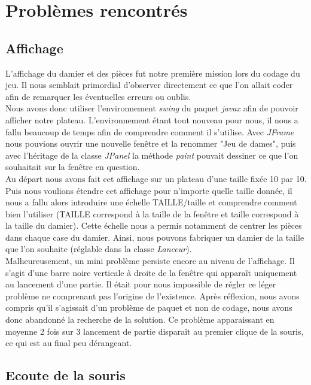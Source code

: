 \documentclass[12,french]{report}
\begin{document}
\chapter{Problèmes rencontrés}

\section{Affichage}

L'affichage du damier et des pièces fut notre première mission lors du codage du jeu.
Il nous semblait primordial d'observer directement ce que l'on allait coder afin de remarquer les éventuelles erreurs ou oublis.\\

Nous avons donc utiliser l'environnement \textit{swing} du paquet \textit{javax} afin de pouvoir afficher notre plateau. L'environnement étant tout nouveau pour nous, il nous a fallu beaucoup de temps afin de comprendre comment il s'utilise. Avec \textit{JFrame} nous pouvions ouvrir une nouvelle fenêtre et la renommer "Jeu de dames", puis avec l'héritage de la classe \textit{JPanel} la méthode \textit{paint} pouvait dessiner ce que l'on souhaitait sur la fenêtre en question.\\

Au départ nous avons fait cet affichage sur un plateau d'une taille fixée 10 par 10. Puis nous voulions étendre cet affichage pour n'importe quelle taille donnée, il nous a fallu alors introduire une échelle TAILLE/taille et comprendre comment bien l'utiliser (TAILLE correspond à la taille de la fenêtre et taille correspond à la taille du damier). Cette échelle nous a permis notamment de centrer les pièces dans chaque case du damier. Ainsi, nous pouvons fabriquer un damier de la taille que l'on souhaite (réglable dans la classe \textit{Lanceur}).\\

Malheureusement, un mini problème persiste encore au niveau de l'affichage. Il s'agit d'une barre noire verticale à droite de la fenêtre qui apparaît uniquement au lancement d'une partie. Il était pour nous impossible de régler ce léger problème ne comprenant pas l'origine de l'existence. Après réflexion, nous avons compris qu'il s'agissait d'un problème de paquet et non de codage, nous avons donc abandonné la recherche de la solution. Ce problème apparaissant en moyenne 2 fois sur 3 lancement de partie disparaît au premier clique de la souris, ce qui est au final peu dérangeant.
 
\section{Ecoute de la souris}
\end{document}

